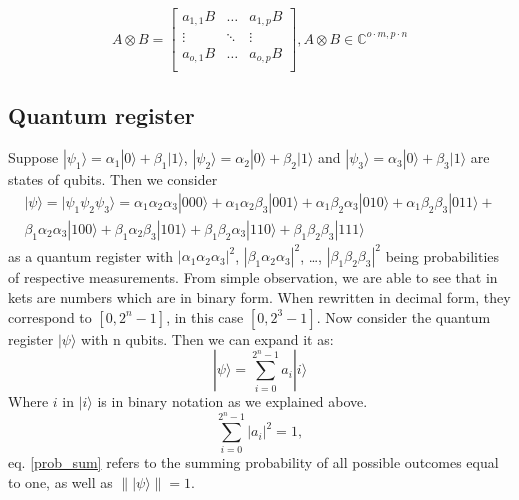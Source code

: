\begin{equation}
A\otimes B =
\begin{bmatrix}
     a_{1,1}B &\hdots &a_{1,p}B\\
     \vdots & \ddots & \vdots\\
     a_{o,1}B &\hdots &a_{o,p}B \\
\end{bmatrix}, A\otimes B \in \mathbb{C}^{o \cdot m,p \cdot n}
\end{equation}



\subsection{Quantum register}

Suppose $|\psi_1\rangle = \alpha_1 |0\rangle +\beta_1 |1\rangle$, $ |\psi_2\rangle = \alpha_2 |0\rangle +\beta_2 |1\rangle$ and $|\psi_3\rangle = \alpha_3 |0\rangle +\beta_3 |1\rangle $ are states of qubits. Then we consider 
\begin{equation} \label{3qubitsystem}
  \begin{aligned}
    |\psi\rangle = |\psi_1 \psi_2 \psi_3\rangle = 
    \alpha_1 \alpha_2 \alpha_3 |000\rangle +
    \alpha_1 \alpha_2 \beta_3 |001\rangle +
    \alpha_1 \beta_2 \alpha_3 |010\rangle +
    \alpha_1 \beta_2 \beta_3 |011\rangle + \\
    \beta_1 \alpha_2 \alpha_3 |100\rangle +
    \beta_1 \alpha_2 \beta_3 |101\rangle +
    \beta_1 \beta_2 \alpha_3 |110\rangle +
    \beta_1 \beta_2 \beta_3 |111\rangle  
    \end{aligned}
\end{equation}
as a quantum register with $ |\alpha_1 \alpha_2 \alpha_3|^2$, $ |\beta_1 \alpha_2 \alpha_3|^2$, \dots , $|\beta_1 \beta_2 \beta_3 |^2$ being probabilities of respective measurements. From simple observation, we are able to see that in kets are numbers which are in binary form. When rewritten in decimal form, they correspond to $[0,2^{n}-1]$, in this case $[0,2^{3}-1]$. Now consider the quantum register $|\psi\rangle$ with n qubits. Then we can expand it as:
\begin{equation} \label{mlti_qubit_state_chapter_2}
    |\psi\rangle =  \sum_{i=0}^{2^n-1} a_i |i\rangle 
\end{equation} \label{multistate_psi}
Where $i$ in $|i\rangle $ is in binary notation as we explained above.
\begin{equation} \label{prob_sum}
    \sum_{i=0}^{2^n-1} |a_i|^2 = 1,
\end{equation}
 eq. \ref{prob_sum} refers to the summing probability of all possible outcomes equal to one, as well as $\lVert | \psi \rangle \rVert = 1$. 

